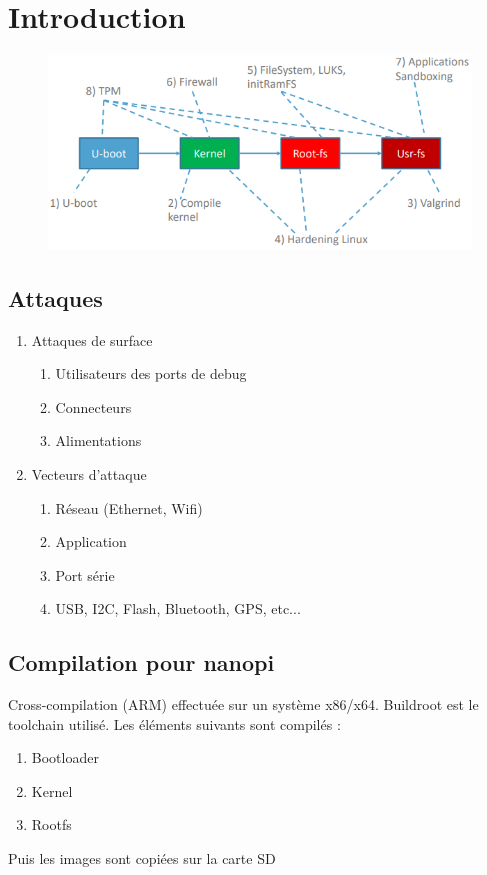 \documentclass[resume]{subfiles}
\begin{document}
\section{Introduction}
\begin{figure}[H]
\centering
\includegraphics[width=\columnwidth]{img_0.png}
\end{figure}

\subsection{Attaques}
\begin{enumerate}
\item Attaques de surface
\begin{enumerate}
\item Utilisateurs des ports de debug
\item Connecteurs
\item Alimentations
\end{enumerate}
\item Vecteurs d'attaque
\begin{enumerate}
\item Réseau (Ethernet, Wifi)
\item Application
\item Port série
\item USB, I2C, Flash, Bluetooth, GPS, etc...
\end{enumerate}
\end{enumerate}
\subsection{Compilation pour nanopi}
Cross-compilation (ARM) effectuée sur un système x86/x64. Buildroot est le toolchain utilisé. Les éléments suivants sont compilés :
\begin{enumerate}
\item Bootloader
\item Kernel
\item Rootfs
\end{enumerate}
Puis les images sont copiées sur la carte SD
\end{document}
